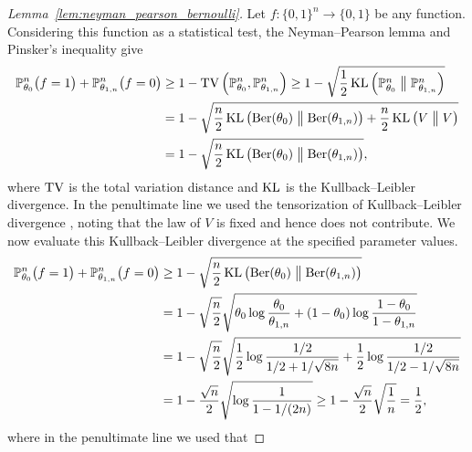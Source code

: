 \begin{proof}[Lemma~\ref{lem:neyman_pearson_bernoulli}]

  Let $f: \{0,1\}^n \to \{0,1\}$
  be any function.
  Considering this function as a statistical test,
  the Neyman--Pearson lemma
  and Pinsker's inequality
  \citep{gine2021mathematical}
  give
  \begin{align*}
    \mathbb{P}_{\theta_0}^n \big(
      f=1
    \big)
    +\mathbb{P}_{\theta_{1,n}}^n \big(
      f=0
    \big)
    &\geq
    1-
    \mathrm{TV}\left(
      \mathbb{P}_{\theta_0}^n,
      \mathbb{P}_{\theta_{1,n}}^n
    \right)
    \geq
    1-
    \sqrt{
      \frac{1}{2}
      \operatorname{KL} \left(
        \mathbb{P}_{\theta_0}^n
        \bigm\|
        \mathbb{P}_{\theta_{1,n}}^n
    \right)} \\
    &=
    1-
    \sqrt{
      \frac{n}{2}
      \operatorname{KL} \left(
        \operatorname{Ber}(\theta_0)
        \bigm\|
        \operatorname{Ber}(\theta_{1,n})
      \right)
      + \frac{n}{2}
      \operatorname{KL} \left(
        V
        \bigm\|
        V
    \right)} \\
    &=
    1-
    \sqrt{
      \frac{n}{2}
      \operatorname{KL} \left(
        \operatorname{Ber}(\theta_0)
        \bigm\|
        \operatorname{Ber}(\theta_{1,n})
    \right)},
  \end{align*}
  where $\mathrm{TV}$ is the total variation distance
  and $\operatorname{KL}$ is the Kullback--Leibler divergence.
  In the penultimate line
  we used the tensorization of Kullback--Leibler divergence
  \citep{gine2021mathematical},
  noting that the law of $V$ is fixed and hence does not contribute.
  We now evaluate this Kullback--Leibler divergence at the specified
  parameter values.
  \begin{align*}
    \mathbb{P}_{\theta_0}^n \big(
      f=1
    \big)
    +\mathbb{P}_{\theta_{1,n}}^n \big(
      f=0
    \big)
    &\geq
    1-
    \sqrt{
      \frac{n}{2}
      \operatorname{KL} \left(
        \operatorname{Ber}(\theta_0)
        \bigm\|
        \operatorname{Ber}(\theta_{1,n})
    \right)} \\
    &=
    1-
    \sqrt{\frac{n}{2}}
    \sqrt{
      \theta_0 \log \frac{\theta_0}{\theta_{1,n}}
    + (1 - \theta_0) \log \frac{1 - \theta_0}{1 - \theta_{1,n}}} \\
    &=
    1-
    \sqrt{\frac{n}{2}}
    \sqrt{
      \frac{1}{2} \log \frac{1/2}{1/2 + 1/\sqrt{8n}}
    + \frac{1}{2} \log \frac{1/2}{1/2 - 1/\sqrt{8n}}} \\
    &=
    1-
    \frac{\sqrt n}{2}
    \sqrt{\log \frac{1}{1 - 1/(2n)}}
    \geq
    1-
    \frac{\sqrt n}{2}
    \sqrt{\frac{1}{n}}
    =
    \frac{1}{2},
  \end{align*}
  where in the penultimate line we used that

\end{proof}
